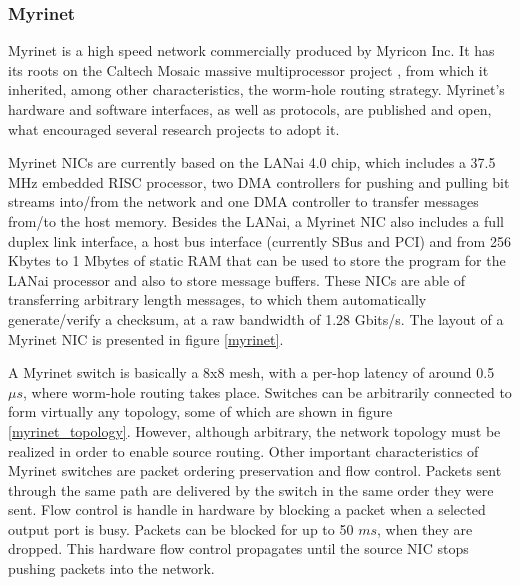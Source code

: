 \subsubsection{\label{hard_comm_myrinet}Myrinet}

	Myrinet \cite{Felderman:94, Boden:95} is a high speed network commercially produced by Myricon Inc. It has its roots on the Caltech Mosaic massive multiprocessor project \cite{Seitz:92}, from which it inherited, among other characteristics, the worm-hole routing strategy. Myrinet's hardware and software interfaces, as well as protocols, are published and open, what encouraged several research projects to adopt it.
		
	Myrinet NICs are currently based on the LANai 4.0 chip, which includes a 37.5 MHz embedded RISC processor, two DMA controllers for pushing and pulling bit streams into/from the network and one DMA controller to transfer messages from/to the host memory.  Besides the LANai, a Myrinet NIC also includes a full duplex link interface, a host bus interface (currently SBus and PCI) and from 256 Kbytes to 1 Mbytes of static RAM that can be used to store the program for the LANai processor and also to store  message buffers. These NICs are able of transferring arbitrary length messages, to which them automatically generate/verify a checksum, at a raw bandwidth of 1.28 Gbits/s. The layout of a Myrinet NIC is presented in figure \ref{myrinet}.

 	
	A Myrinet switch is basically a 8x8 mesh, with a per-hop latency of around 0.5 $\mu s$, where worm-hole routing takes place. Switches can be arbitrarily connected to form virtually any topology, some of which are shown in figure \ref{myrinet_topology}. However, although arbitrary, the network topology must be realized in order to enable source routing. Other important characteristics of Myrinet switches are packet ordering preservation and flow control. Packets sent through the same path are delivered by the switch in the same order they were sent. Flow control is handle in hardware by blocking a packet when a selected output port is busy. Packets can be blocked for up to 50 $ms$, when they are dropped. This hardware flow control propagates until the source NIC stops pushing packets into the network.


